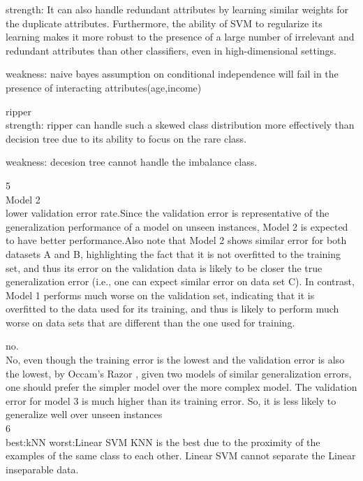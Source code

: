 \documentclass[12pt]{article}
\begin{document}
strength:
It can also handle redundant attributes by learning similar weights for the duplicate attributes. Furthermore, the ability of SVM to regularize its learning makes it more robust to the presence of a large number of irrelevant and redundant attributes than other classifiers, even in high-dimensional settings. 

weakness:
naive bayes assumption on conditional independence will fail in the presence of interacting attributes(age,income)

ripper\\

strength:
ripper can handle such a skewed class distribution more effectively than decision tree due to its ability to focus on the rare class.

weakness:
decesion tree cannot handle the imbalance class.

5\\

Model 2\\

lower validation error rate.Since the validation
error is representative of the generalization performance of a model on unseen instances, Model 2 is
expected to have better performance.Also note that Model 2 shows similar error for both datasets A
and B, highlighting the fact that it is not overfitted to the training set, and thus its error on the
validation data is likely to be closer the true generalization error (i.e., one can expect similar error on
data set C). In contrast, Model 1 performs much worse on the validation set, indicating that it is
overfitted to the data used for its training, and thus is likely to perform much worse on data sets that
are different than the one used for training.

no.\\

No, even though the training error is the lowest and the validation error is also the lowest, by
Occam’s Razor , given two models of similar generalization errors, one should prefer the simpler
model over the more complex model. The validation error for model 3 is much higher than its training
error. So, it is less likely to generalize well over unseen instances\\

6\\

best:kNN
worst:Linear SVM
KNN is the best due to the proximity of the
examples of the same class to each other.
Linear SVM cannot separate the Linear inseparable data.\\
\end{document}
